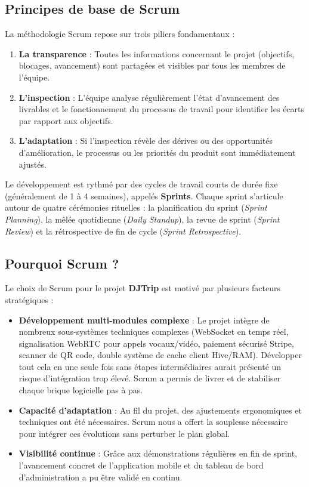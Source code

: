 \documentclass[12pt,a4paper]{report}
\begin{document}
\subsection{Principes de base de Scrum}
La méthodologie Scrum repose sur trois piliers fondamentaux :
\begin{enumerate}
    \item \textbf{La transparence} : Toutes les informations concernant le projet (objectifs, blocages, avancement) sont partagées et visibles par tous les membres de l'équipe.
    \item \textbf{L'inspection} : L'équipe analyse régulièrement l'état d'avancement des livrables et le fonctionnement du processus de travail pour identifier les écarts par rapport aux objectifs.
    \item \textbf{L'adaptation} : Si l'inspection révèle des dérives ou des opportunités d'amélioration, le processus ou les priorités du produit sont immédiatement ajustés.
\end{enumerate}

Le développement est rythmé par des cycles de travail courts de durée fixe (généralement de 1 à 4 semaines), appelés \textbf{Sprints}. Chaque sprint s'articule autour de quatre cérémonies rituelles : la planification du sprint (\textit{Sprint Planning}), la mêlée quotidienne (\textit{Daily Standup}), la revue de sprint (\textit{Sprint Review}) et la rétrospective de fin de cycle (\textit{Sprint Retrospective}).

\subsection{Pourquoi Scrum ?}
Le choix de Scrum pour le projet \textbf{DJTrip} est motivé par plusieurs facteurs stratégiques :
\begin{itemize}[label=\textbullet]
    \item \textbf{Développement multi-modules complexe} : Le projet intègre de nombreux sous-systèmes techniques complexes (WebSocket en temps réel, signalisation WebRTC pour appels vocaux/vidéo, paiement sécurisé Stripe, scanner de QR code, double système de cache client Hive/RAM). Développer tout cela en une seule fois sans étapes intermédiaires aurait présenté un risque d'intégration trop élevé. Scrum a permis de livrer et de stabiliser chaque brique logicielle pas à pas.
    \item \textbf{Capacité d'adaptation} : Au fil du projet, des ajustements ergonomiques et techniques ont été nécessaires. Scrum nous a offert la souplesse nécessaire pour intégrer ces évolutions sans perturber le plan global.
    \item \textbf{Visibilité continue} : Grâce aux démonstrations régulières en fin de sprint, l'avancement concret de l'application mobile et du tableau de bord d'administration a pu être validé en continu.
\end{itemize}
\end{document}
